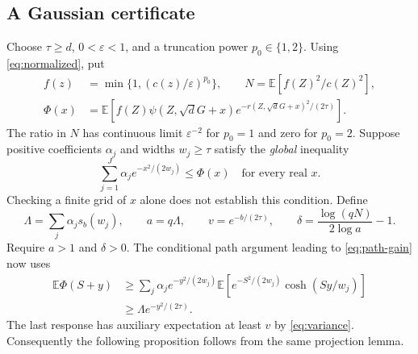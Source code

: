 \documentclass[11pt]{article}
\theoremstyle{definition}
\theoremstyle{remark}
\newcommand{\E}{\mathbb E}
\begin{document}
\subsection{A Gaussian certificate}
Choose $\tau\ge d$, $0<\varepsilon<1$, and a truncation power
$p_0\in\{1,2\}$. Using \eqref{eq:normalized}, put
\begin{equation}
 \begin{aligned}
 f(z)&=\min\{1,(c(z)/\varepsilon)^{p_0}\},\qquad
 N=\E[f(Z)^2/c(Z)^2],\\
 \Phi(x)&=\E\left[f(Z)\psi(Z,\sqrt d G+x)
                 e^{-r(Z,\sqrt dG+x)^2/(2\tau)}\right].
 \end{aligned}
 \label{eq:Phi}
\end{equation}
The ratio in $N$ has continuous limit $\varepsilon^{-2}$ for $p_0=1$
and zero for $p_0=2$. Suppose positive coefficients $\alpha_j$ and widths
$w_j\ge\tau$ satisfy the \emph{global} inequality
\begin{equation}
 \sum_{j=1}^{J}\alpha_j e^{-x^2/(2w_j)}\le\Phi(x)
                  \quad\text{for every real }x.
 \label{eq:certificate}
\end{equation}
Checking a finite grid of $x$ alone does not establish this condition.
Define
\[
 \Lambda=\sum_j\alpha_j s_b(w_j),\qquad
 a=q\Lambda,\qquad v=e^{-b/(2\tau)},\qquad
 \delta=\frac{\log(qN)}{2\log a}-1.
\]
Require $a>1$ and $\delta>0$. The conditional path argument leading to
\eqref{eq:path-gain} now uses
\begin{align*}
 \E\Phi(S+y)
 &\ge\sum_j\alpha_j e^{-y^2/(2w_j)}
                 \E[e^{-S^2/(2w_j)}\cosh(Sy/w_j)]\\
 &\ge\Lambda e^{-y^2/(2\tau)}.
\end{align*}
The last response has auxiliary expectation at least $v$ by
\eqref{eq:variance}. Consequently the following proposition follows from
the same projection lemma.
\end{document}
